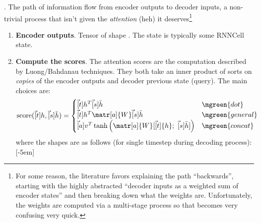\documentclass[11pt]{article}
\begin{document}
\p {}. The path of information flow from encoder outputs to decoder inputs, a non-trivial process that isn't given the \textit{attention} (heh) it deserves\footnote{For some reason, the literature favors explaining the path ``backwards'', starting with the highly abstracted ``decoder inputs as a weighted sum of encoder states'' and then breaking down what the weights are. Unfortunately, the weights are computed via a multi-stage process so that becomes very confusing very quick.}
\begin{enumerate}
	\item \textbf{Encoder outputs}. Tensor of shape . The state is typically some RNNCell state.
	
	
	\item \textbf{Compute the scores}. The attention scores are the computation described by Luong/Bahdanau techniques. They both take an inner product of sorts on \textit{copies} of the encoder outputs and decoder previous state (query). The main choices are:
	\begin{align}
	\text{score}(\vec[t]{h}, \vec[s]{\bar h}) 
	&= \begin{cases}
	\vec[t]{h}^T \vec[s]{\bar h} & \mgreen{dot} \\
	\vec[t]{h}^T \matr[a]{W} \vec[s]{\bar h} & \mgreen{general} \\
	\vec[a]{v}^T \tanh\left(\matr[a]{W} [\vec[t]{h}; ~ \vec[s]{\bar h}] \right) & \mgreen{concat} 
	\end{cases}
	\end{align}
	where the shapes are as follows (for single timestep during decoding process):[-5em]
	

\end{enumerate}
\end{document}
